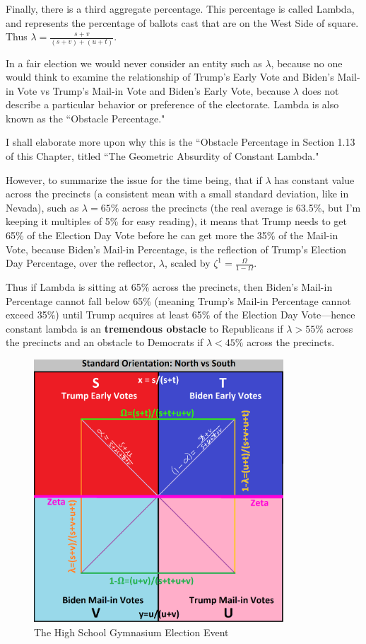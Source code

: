 Finally, there is a third aggregate percentage. This percentage is called Lambda, and represents the percentage of ballots cast that are on the West Side of square. Thus $\lambda=\frac{s+v}{(s+v)+(u+t)}$.

In a fair election we would never consider an entity such as $\lambda$, because no one would think to examine the relationship of Trump's Early Vote and Biden's Mail-in Vote vs Trump's Mail-in Vote and Biden's Early Vote, because $\lambda$ does not describe a particular behavior or preference of the electorate. Lambda is also known as the ``Obstacle Percentage." 

I shall elaborate more upon why this is the ``Obstacle Percentage in Section 1.13 of this Chapter, titled ``The Geometric Absurdity of Constant Lambda." 

However, to summarize the issue for the time being, that if $\lambda$ has constant value across the precincts (a consistent mean with a small standard deviation, like in Nevada), such as $\lambda=65\%$ across the precincts (the real average is 63.5\%, but I'm keeping it multiples of 5\% for easy reading), it means that Trump needs to get 65\% of the Election Day Vote before he can get more the 35\% of the Mail-in Vote, because Biden's Mail-in Percentage, is the reflection of Trump's Election Day Percentage, over the reflector, $\lambda$, scaled by $\zeta^{1}=\frac{\Omega}{1-\Omega}$. 

Thus if Lambda is sitting at 65\% across the precincts, then Biden's Mail-in Percentage cannot fall below 65\% (meaning Trump's Mail-in Percentage cannot exceed 35\%) until Trump acquires at least 65\% of the Election Day Vote---hence constant lambda is an \textbf{tremendous obstacle} to Republicans if $\lambda>55\%$ across the precincts and an obstacle to Democrats if $\lambda<45\%$ across the precincts.

\begin{figure}[bp!]
\begin{center}
\caption{The High School Gymnasium Election Event}
\includegraphics[width=265pt]{North vs South.png}
\end{center}
\end{figure}
\newpage
